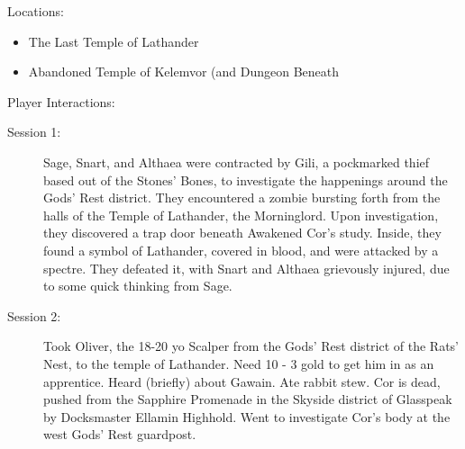 \documentclass[11pt]{article}
\theoremstyle{definition}
\theoremstyle{remark}
\begin{document}
\begin{description}
\item{Locations:}

\begin{itemize}

\item{The Last Temple of Lathander}

\item{Abandoned Temple of Kelemvor (and Dungeon Beneath}

\end{itemize}

\item{Player Interactions: }
\begin{description}
\item[Session 1:] {
Sage, Snart, and Althaea were contracted by Gili, a pockmarked thief based out of the Stones' Bones, to investigate the happenings around the Gods' Rest district. They encountered a zombie bursting forth from the halls of the Temple of Lathander, the Morninglord. Upon investigation, they discovered a trap door beneath Awakened Cor's study. Inside, they found a symbol of Lathander, covered in blood, and were attacked by a spectre. They defeated it, with Snart and Althaea grievously injured, due to some quick thinking from Sage.
}

\item[Session 2:]{
  Took Oliver, the 18-20 yo Scalper from the Gods' Rest district of the Rats' Nest, to the temple of Lathander. Need 10 - 3 gold to get him in as an apprentice. Heard (briefly) about Gawain. Ate rabbit stew. Cor is dead, pushed from the Sapphire Promenade in the Skyside district of Glasspeak by Docksmaster Ellamin Highhold. Went to investigate Cor's body at the west Gods' Rest guardpost.
}

\end{description}

\end{description}
\end{document}
